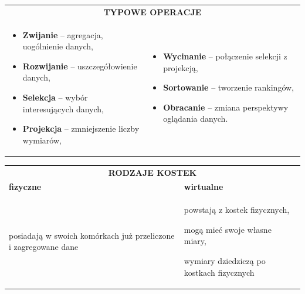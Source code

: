 \documentclass[a4paper]{article}
\begin{document}
    \begin{table}[H]
        \begin{center}
            \begin{tabular}{p{8cm} p{8cm}}
                \multicolumn{2}{c}{\textbf{TYPOWE OPERACJE}}\\
                \begin{itemize}
                    \item \textbf{Zwijanie} – agregacja, uogólnienie danych,
                    \item \textbf{Rozwijanie} – uszczegółowienie danych,
                    \item \textbf{Selekcja} – wybór interesujących danych,
                    \item \textbf{Projekcja} – zmniejszenie liczby wymiarów,
                \end{itemize}
                &
                \begin{itemize}
                    \item \textbf{Wycinanie} – połączenie selekcji z projekcją,
                    \item \textbf{Sortowanie} – tworzenie rankingów,
                    \item \textbf{Obracanie} – zmiana perspektywy oglądania danych.
                \end{itemize}\\
            \end{tabular}
        \end{center}
    \end{table}

    \begin{table}[H]
        \begin{center}
            \begin{tabular}{p{8cm} p{8cm}}
                \multicolumn{2}{c}{\textbf{RODZAJE KOSTEK}}\\
                \textbf{fizyczne} & \textbf{wirtualne}\\
                posiadają w swoich komórkach już przeliczone i zagregowane dane
                &
                powstają z kostek fizycznych,

                mogą mieć swoje własne miary,

                wymiary dziedziczą po kostkach fizycznych
            \end{tabular}
        \end{center}
    \end{table}
\end{document}
